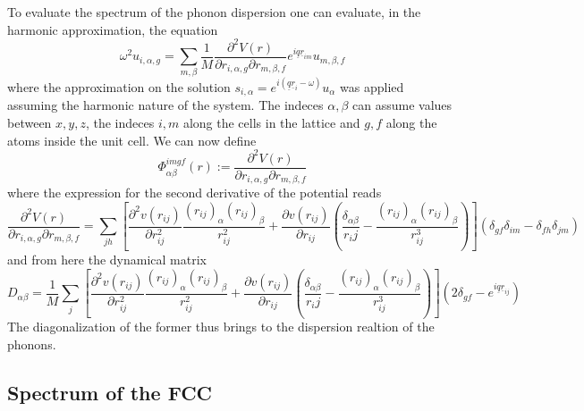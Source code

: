 \documentclass[a4paper]{article}
\begin{document}
    To evaluate the spectrum of the phonon dispersion one can evaluate, in the harmonic approximation, the equation 
    \begin{equation}
        \omega^2 u_{i,\alpha, g} = \sum_{m,\beta} \frac{1}{M}\frac{\partial^2 V(r)}{\partial r_{i,\alpha, g}\partial r_{m,\beta,f}}e^{i\underline{q}\underline{r}_{im}}u_{m,\beta, f}
    \end{equation}
    where the approximation on the solution $s_{i,\alpha}=e^{i(\underline{q}\underline{r}_i - \omega)}u_{\alpha}$ was applied assuming the harmonic nature of the system.
    The indeces $\alpha,\beta$ can assume values between $x,y,z$, the indeces $i,m$ along the cells in the lattice and $g,f$ along the atoms inside the unit cell.
    We can now define 
    \begin{equation}
        \Phi_{\alpha\beta}^{imgf}(r):=\frac{\partial^2 V(r)}{\partial r_{i,\alpha,g}\partial r_{m,\beta,f}}
    \end{equation}
    where the expression for the second derivative of the potential reads
    \begin{equation*}
        \frac{\partial^2 V(r)}{\partial r_{i,\alpha,g}\partial r_{m,\beta,f}} = \sum_{jh}\left[\frac{\partial^2 v(r_{ij})}{\partial r_{ij}^2}\frac{(r_{ij})_{\alpha}(r_{ij})_{\beta}}{r_{ij}^2} + \frac{\partial v(r_{ij})}{\partial r_{ij}}\left(\frac{\delta_{\alpha\beta}}{r_ij}-\frac{(r_{ij})_{\alpha}(r_{ij})_{\beta}}{r_{ij}^3}\right)\right](\delta_{gf}\delta_{im}-\delta_{fh}\delta_{jm})
    \end{equation*}
    and from here the dynamical matrix
    \begin{equation}
        D_{\alpha\beta} = \frac{1}{M}\sum_j\left[\frac{\partial^2 v(r_{ij})}{\partial r_{ij}^2}\frac{(r_{ij})_{\alpha}(r_{ij})_{\beta}}{r_{ij}^2} + \frac{\partial v(r_{ij})}{\partial r_{ij}}\left(\frac{\delta_{\alpha\beta}}{r_ij}-\frac{(r_{ij})_{\alpha}(r_{ij})_{\beta}}{r_{ij}^3}\right)\right]\left(2\delta_{gf}-e^{i\underline{q}\underline{r}_{ij}}\right)
    \end{equation}
    The diagonalization of the former thus brings to the dispersion realtion of the phonons.

    \subsection{Spectrum of the FCC}
\end{document}
